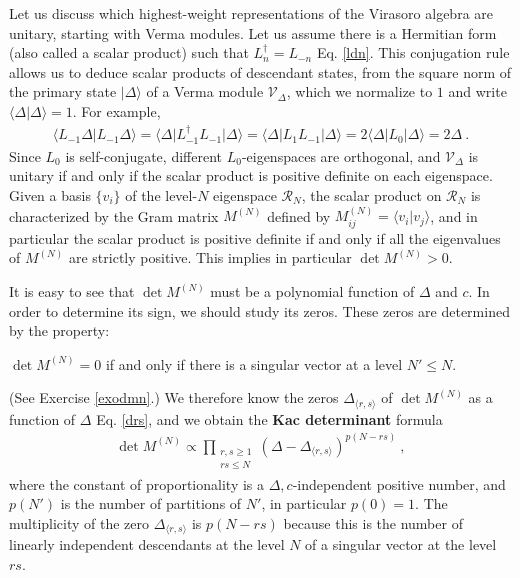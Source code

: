 \documentclass[12pt, a4paper, notitlepage, twoside]{report}
\numberwithin{equation}{section}
\theoremstyle{break}
\begin{document}
Let us discuss which highest-weight representations of the Virasoro algebra are unitary, starting with Verma modules. Let us assume there is a Hermitian form (also called a scalar product) such that $L_n^\dagger = L_{-n}$ Eq. \eqref{ldn}.
This conjugation rule allows us to deduce scalar products of descendant states, from the square norm of the primary state $|\Delta\rangle$ of a Verma module $\mathcal{V}_\Delta$, which we normalize to $1$ and write  $\langle \Delta|\Delta\rangle =1$. 
For example,
\begin{align}
 \langle L_{-1} \Delta|L_{-1}\Delta\rangle = \langle \Delta |L_{-1}^\dagger L_{-1}|\Delta\rangle =\langle \Delta |L_1 L_{-1}|\Delta\rangle = 2\langle \Delta|L_0|\Delta\rangle = 2\Delta\ . 
\label{levo} 
\end{align}
Since $L_0$ is self-conjugate, different $L_0$-eigenspaces are orthogonal, and $\mathcal V_\Delta$ is unitary if and only if the scalar product is positive definite on each eigenspace. 
Given a basis $\{v_i\}$ of the level-$N$ eigenspace $\mathcal{R}_N$, the scalar product on $\mathcal{R}_N$ is characterized by the Gram matrix $M^{(N)}$ defined by $M^{(N)}_{ij}=\langle v_i|v_j\rangle$, and in particular the scalar product is positive definite if and only if all the eigenvalues of $M^{(N)}$ are strictly positive. This implies in particular $\det M^{(N)}>0$.

It is easy to see that $\det M^{(N)}$ must be a polynomial function of $\Delta$ and $c$.
In order to determine its sign, we should study its zeros. These zeros are determined by the property:
\begin{center}
 \begin{minipage}{0.9\textwidth}
 $\det M^{(N)}=0$ if and only if there is a singular vector at a level $N'\leq N$.  
 \end{minipage}
\end{center}
(See Exercise \ref{exodmn}.) 
We therefore know the zeros $\Delta_{\langle r,s \rangle}$ of $\det M^{(N)}$ as a function of $\Delta$ Eq. \eqref{drs}, and we obtain the \textbf{\boldmath Kac determinant} formula
\begin{align}
 \boxed{\det M^{(N)} \propto \prod_{\begin{smallmatrix} r,s\geq 1 \\ rs \leq N \end{smallmatrix}} (\Delta-\Delta_{\langle r,s \rangle})^{p(N-rs)}} \ ,
\end{align}
where the constant of proportionality is a $\Delta,c$-independent positive number, and $p(N')$ is the number of partitions of $N'$, in particular $p(0)=1$.
The multiplicity of the zero $\Delta_{\langle r,s \rangle}$ is $p(N-rs)$ because this is the number of linearly independent descendants at the level $N$ of a singular vector at the level $rs$.  
\end{document}
